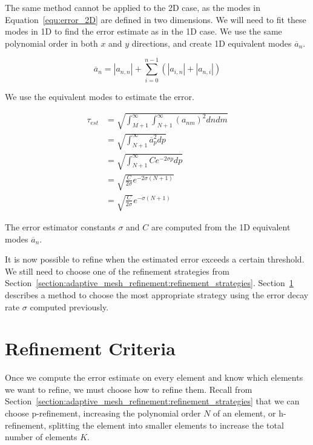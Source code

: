 The same method cannot be applied to the 2D case, as the modes in Equation~\ref{equ:error_2D} are
defined in two dimensions. We will need to fit these modes in 1D to find the error estimate as in
the 1D case. We use the same polynomial order in both \(x\) and \(y\) directions, and create 1D
equivalent modes \(\overline{a}_n\).

\begin{equation}
    \overline{a}_n = \left| a_{n,n} \right| + \sum_{i = 0}^{n-1} \left( \left| a_{i, n} \right| + \left| a_{n, i} \right| \right)
\end{equation}

\noindent
We use the equivalent modes to estimate the error.

\begin{equation}
    \begin{aligned}
        \tau_{est} & = \sqrt{\int_{M+1}^{\infty }\int_{N + 1 }^{\infty}{(a_{nm})}^2 dn dm} \\
                   & = \sqrt{\int_{N + 1}^{\infty }\overline{a}_p^2 dp}                    \\
                   & = \sqrt{\int_{N + 1}^{\infty} Ce^{-2\sigma p}dp}                      \\
                   & = \sqrt{\frac{C}{2\sigma}e^{-2\sigma(N + 1)}}                         \\
                   & = \sqrt{\frac{C}{2\sigma}} e^{-\sigma (N + 1)}
    \end{aligned}
\end{equation}

\noindent
The error estimator constants \(\sigma \) and \(C\) are computed from the 1D equivalent modes
\(\overline{a}_n\).

It is now possible to refine when the estimated error exceeds a certain threshold. We still need to
choose one of the refinement strategies from
Section~\ref{section:adaptive_mesh_refinement:refinement_strategies}.
Section~\ref{section:adaptive_mesh_refinement:refinement_criteria} describes a method to choose the
most appropriate strategy using the error decay rate \(\sigma \) computed previously.

\section{Refinement Criteria}\label{section:adaptive_mesh_refinement:refinement_criteria}

Once we compute the error estimate on every element and know which elements we want to refine, we
must choose how to refine them. Recall from
Section~\ref{section:adaptive_mesh_refinement:refinement_strategies} that we can choose
p-refinement, increasing the polynomial order \(N\) of an element, or h-refinement, splitting the
element into smaller elements to increase the total number of elements \(K\).

